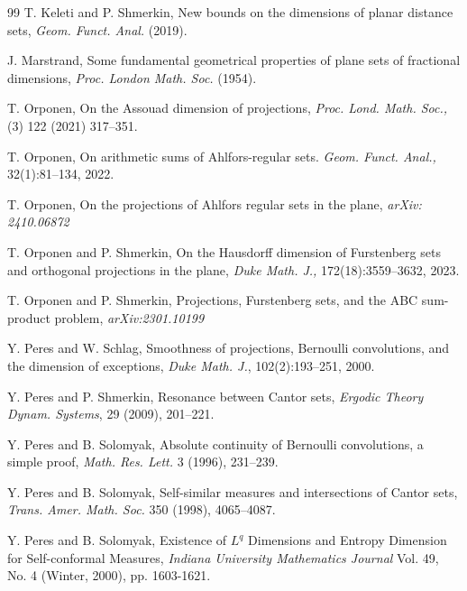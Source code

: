 \documentclass[a4paper,11pt]{amsart}
\theoremstyle{definition}
\numberwithin{equation}{section}
\begin{document}
\begin{thebibliography}{99}
 T. Keleti and P. Shmerkin,  New bounds on the dimensions of planar distance sets, {\em Geom. Funct. Anal.} (2019).

  J. Marstrand,  Some fundamental geometrical properties of plane sets of fractional
dimensions, {\em Proc. London Math. Soc.} (1954).


 T. Orponen,  On the Assouad dimension of projections,  {\em Proc. Lond.
Math. Soc.,} (3) 122 (2021) 317--351.

 T. Orponen,  On arithmetic sums of Ahlfors-regular sets.  {\em Geom. Funct. Anal.,} 32(1):81–134, 2022.

 T. Orponen,  On the projections of Ahlfors regular sets in the plane,  {\em arXiv: 2410.06872}

 T.  Orponen and P.  Shmerkin,  On the Hausdorff dimension of Furstenberg sets and orthogonal
projections in the plane,   {\em Duke Math. J.,} 172(18):3559–3632, 2023.
  
 T.  Orponen and P.  Shmerkin,  Projections, Furstenberg sets, and the ABC sum-product problem,   {\em arXiv:2301.10199}

 Y.  Peres and W. Schlag,  Smoothness of projections, Bernoulli convolutions,
and the dimension of exceptions,  {\em Duke Math. J.}, 102(2):193--251, 2000.

 Y. Peres and P. Shmerkin,  Resonance between Cantor sets,  {\em Ergodic Theory
Dynam. Systems},   29 (2009), 201--221.

 Y. Peres and B.  Solomyak,  Absolute continuity of Bernoulli convolutions, a simple proof,
{\em Math.  Res.  Lett. } 3 (1996), 231--239.

 Y. Peres and B.  Solomyak,   Self-similar measures and intersections of Cantor sets,  {\em Trans. Amer. Math. Soc. } 350 (1998), 4065--4087.

 Y. Peres and B. Solomyak,  Existence of $L^q$ Dimensions and Entropy Dimension for Self-conformal Measures,  {\em Indiana University Mathematics Journal} Vol. 49, No. 4 (Winter, 2000), pp. 1603-1621.


\end{thebibliography}
\end{document}

